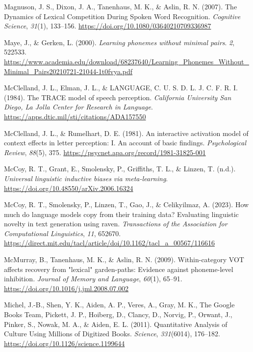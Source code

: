 \documentclass[
  12pt,
  letterpaper,
]{scrreprt}
\newlength{\cslhangindent}
\newenvironment{CSLReferences}[2] %
 {\begin{list}{}{%
  \setlength{\itemindent}{0pt}
  \setlength{\leftmargin}{0pt}
  \setlength{\parsep}{0pt}
  \ifodd #1
   \setlength{\leftmargin}{\cslhangindent}
   \setlength{\itemindent}{-1\cslhangindent}
  \fi
  \setlength{\itemsep}{#2\baselineskip}}}
 {\end{list}}
\begin{document}
\begin{CSLReferences}{1}{0}
Magnuson, J. S., Dixon, J. A., Tanenhaus, M. K., \& Aslin, R. N. (2007).
The Dynamics of Lexical Competition During Spoken Word Recognition.
\emph{Cognitive Science}, \emph{31}(1), 133--156.
\url{https://doi.org/10.1080/03640210709336987}

Maye, J., \& Gerken, L. (2000). \emph{Learning phonemes without minimal
pairs}. \emph{2}, 522533.
\url{https://www.academia.edu/download/68237640/Learning_Phonemes_Without_Minimal_Pairs20210721-21044-1t0fvya.pdf}

McClelland, J. L., Elman, J. L., \& LANGUAGE, C. U. S. D. L. J. C. F. R.
I. (1984). The TRACE model of speech perception. \emph{California
University San Diego, La Jolla Center for Research in Language}.
\url{https://apps.dtic.mil/sti/citations/ADA157550}

McClelland, J. L., \& Rumelhart, D. E. (1981). An interactive activation
model of context effects in letter perception: I. An account of basic
findings. \emph{Psychological Review}, \emph{88}(5), 375.
\url{https://psycnet.apa.org/record/1981-31825-001}

McCoy, R. T., Grant, E., Smolensky, P., Griffiths, T. L., \& Linzen, T.
(n.d.). \emph{Universal linguistic inductive biases via meta-learning}.
\url{https://doi.org/10.48550/arXiv.2006.16324}

McCoy, R. T., Smolensky, P., Linzen, T., Gao, J., \& Celikyilmaz, A.
(2023). How much do language models copy from their training data?
Evaluating linguistic novelty in text generation using raven.
\emph{Transactions of the Association for Computational Linguistics},
\emph{11}, 652670.
\url{https://direct.mit.edu/tacl/article/doi/10.1162/tacl_a_00567/116616}

McMurray, B., Tanenhaus, M. K., \& Aslin, R. N. (2009). Within-category
VOT affects recovery from {"}lexical{"} garden-paths: Evidence against
phoneme-level inhibition. \emph{Journal of Memory and Language},
\emph{60}(1), 65--91. \url{https://doi.org/10.1016/j.jml.2008.07.002}

Michel, J.-B., Shen, Y. K., Aiden, A. P., Veres, A., Gray, M. K., The
Google Books Team, Pickett, J. P., Hoiberg, D., Clancy, D., Norvig, P.,
Orwant, J., Pinker, S., Nowak, M. A., \& Aiden, E. L. (2011).
Quantitative Analysis of Culture Using Millions of Digitized Books.
\emph{Science}, \emph{331}(6014), 176--182.
\url{https://doi.org/10.1126/science.1199644}


\end{CSLReferences}
\end{document}
